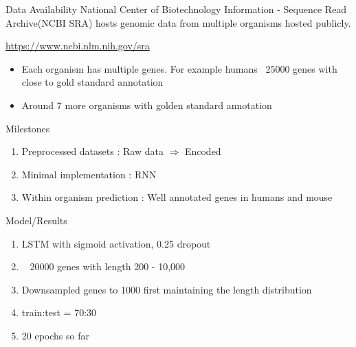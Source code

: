 \documentclass[11pt]{beamer}
\begin{document}
\begin{frame}{Data Availability}
National Center of Biotechnology Information - Sequence Read Archive(NCBI SRA) hosts genomic data from multiple organisms hosted publicly.

\url{https://www.ncbi.nlm.nih.gov/sra}
\begin{itemize}
\item Each organism has multiple genes. For example humans ~25000 genes with close to gold standard annotation
\item Around 7 more organisms with golden standard annotation
\end{itemize}



\end{frame}

\begin{frame}{Milestones}
\begin{enumerate}
\item Preprocessed datasets : Raw data $\Rightarrow$ Encoded
\item Minimal implementation : RNN
\item Within organism prediction : Well annotated genes in humans and mouse
\end{enumerate}
\end{frame}

\begin{frame}{Model/Results}
\begin{enumerate}
\item LSTM with sigmoid activation, 0.25 dropout
\item ~ 20000 genes with length 200 - 10,000 
\item Downsampled genes to 1000 first maintaining the length distribution
\item train:test = 70:30
\item 20 epochs so far
\end{enumerate}
\end{frame}
\end{document}

